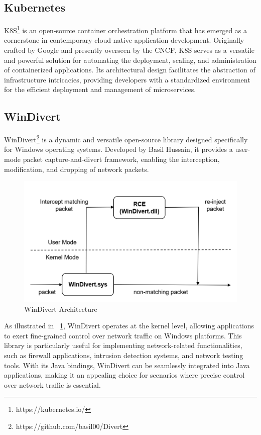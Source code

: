 \subsection{Kubernetes}
\label{subsec:kubernetes}
\acf{K8S}\footnote{https://kubernetes.io/} is an open-source container orchestration platform that has emerged as a cornerstone in contemporary cloud-native application development. Originally crafted by Google and presently overseen by the \ac{CNCF}, \ac{K8S} serves as a versatile and powerful solution for automating the deployment, scaling, and administration of containerized applications. Its architectural design facilitates the abstraction of infrastructure intricacies, providing developers with a standardized environment for the efficient deployment and management of microservices.~\cite{noauthor_production-grade_nodate}

\subsection{WinDivert}
WinDivert\footnote{https://github.com/basil00/Divert} is a dynamic and versatile open-source library designed specifically for Windows operating systems. Developed by Basil Hussain, it provides a user-mode packet capture-and-divert framework, enabling the interception, modification, and dropping of network packets.

\begin{figure}
    \centering
    \includegraphics[width=\linewidth]{files/figures/WinDivert.png}
    \caption{WinDivert Architecture}
    \label{fig:WinDivert}
\end{figure}

As illustrated in ~\cref{fig:WinDivert}, WinDivert operates at the kernel level, allowing applications to exert fine-grained control over network traffic on Windows platforms. This library is particularly useful for implementing network-related functionalities, such as firewall applications, intrusion detection systems, and network testing tools. With its Java bindings, WinDivert can be seamlessly integrated into Java applications, making it an appealing choice for scenarios where precise control over network traffic is essential.~\cite{noauthor_windivert:_nodate}

